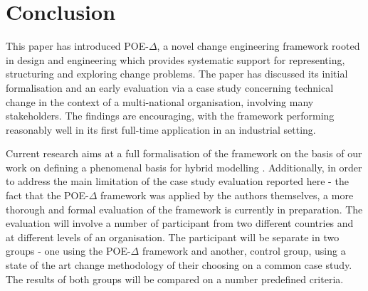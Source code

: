 \documentclass[runningheads,a4paper]{llncs}
\begin{document}
\section{Conclusion}\label{sect:Conclusion}
This paper has introduced POE-$\Delta$, a novel change engineering framework rooted in design and engineering which provides systematic support for representing, structuring and exploring change problems. The paper has discussed its initial formalisation and an early evaluation via a case study concerning technical change in the context of a multi-national organisation, involving many stakeholders. The findings are encouraging, with the framework performing reasonably well in its first full-time application in an industrial setting. 

Current research aims at a full formalisation of the framework on the basis of our work on defining a phenomenal basis for hybrid modelling \cite{hall2017phenomenal}. Additionally, in order to address the main limitation of the case study evaluation reported here - the fact that the POE-$\Delta$ framework was applied by the authors themselves, a more thorough and formal evaluation of the framework is currently in preparation. The evaluation will involve a number of participant from two different countries and at different levels of an organisation. The participant will be separate in two groups - one using the POE-$\Delta$ framework and another, control group, using a state of the art change methodology of their choosing on a common case study. The results of both groups will be compared on a number predefined criteria.

\frenchspacing


\end{document}
